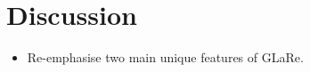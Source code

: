 \section{Discussion}\label{sec:discussion}

\begin{itemize}
    \item Re-emphasise two main unique features of GLaRe.
\end{itemize}